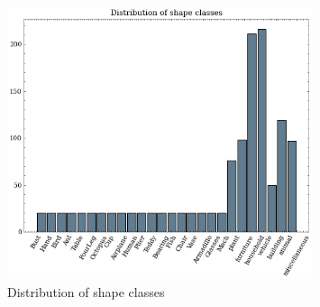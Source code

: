 \begin{figure}
    \centering
    \includegraphics[width = 0.8\textwidth]{assets/preprocessing/Distribution_of_shape_classes.png}
    \caption{Distribution of shape classes}
    \label{fig:class-distribution}
\end{figure} 

